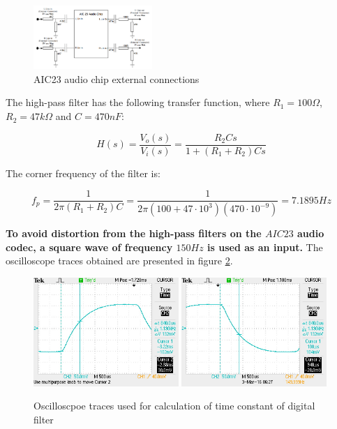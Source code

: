 \documentclass{article}
\begin{document}
\begin{figure}[H]
\centering
\includegraphics[width=0.4\textwidth]{AIC23.PNG}
\caption{AIC23 audio chip external connections\cite{AIC23_technical_reference}}
\label{fig:AIC23_audio_codec}
\end{figure}

The high-pass filter has the following transfer function, where $R_{1}=100 \Omega$, $R_{2}=47 k\Omega$ and $C=470nF$:

\begin{equation}
    H(s)=\frac{V_o(s)}{V_{i}(s)} = \frac{R_{2}Cs}{1 + (R_{1}+R_{2})Cs}   
\end{equation}

The corner frequency of the filter is:

\begin{equation}
     f_p = \frac{1}{2\pi (R_1+R_2)C} = \frac{1}{2\pi (100 + 47\cdot 10^{3})(470\cdot 10^{-9})} = 7.1895Hz
\end{equation}

\textbf{To avoid distortion from the high-pass filters on the $AIC23$ audio codec, a square wave of frequency $150Hz$ is used as an input.} The oscilloscope traces obtained are presented in figure \ref{fig:scope_RC}.

\begin{figure}[H]
\centering
\includegraphics[width=0.49\textwidth]{RC_rising}
\includegraphics[width=0.49\textwidth]{RC_falling}
\caption{Oscilloscpoe traces used for calculation of time constant of digital filter}
\label{fig:scope_RC}
\end{figure}
\end{document}
